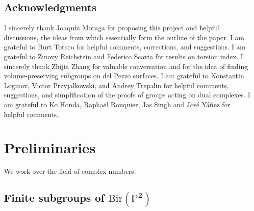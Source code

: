 \documentclass[a4paper,12pt,oneside]{amsart}
\numberwithin{equation}{section}
\theoremstyle{definition}
\theoremstyle{remark}
\begin{document}
\subsection*{Acknowledgments}
I sincerely thank Joaquín Moraga for proposing this project and helpful discussions, the ideas from which essentially form the outline of the paper. I am grateful to Burt Totaro for helpful comments, corrections, and suggestions. I am grateful to Zinovy Reichstein and Federico Scavia for results on torsion index. I sincerely thank Zhijia Zhang for valuable conversation and for the idea of finding volume-preserving subgroups on del Pezzo surfaces. I am grateful to Konstantin Loginov, Victor Przyjalkowski, and Andrey Trepalin for helpful comments, suggestions, and simplification of the proofs of groups acting on dual complexes. I am grateful to Ko Honda, Raphaël Rouquier, Jas Singh and José Yáñez for helpful comments.
\newpage
\section{Preliminaries}
We work over the field of complex numbers.
\subsection{Finite subgroups of $\boldsymbol{\mathrm{Bir}(\mathbb{P}^2)}$}
\end{document}
